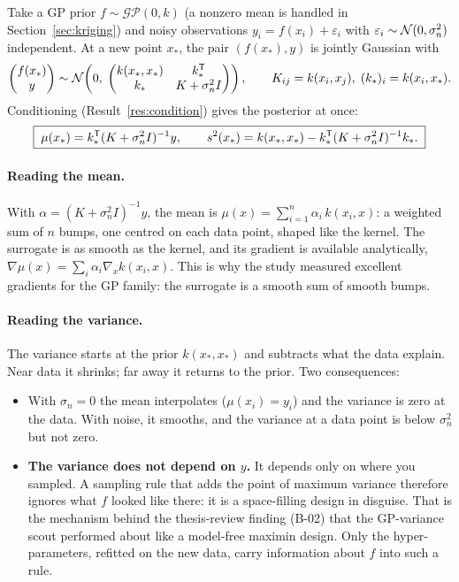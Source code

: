Take a GP prior $f \sim \mathcal{GP}(0, k)$ (a nonzero mean is handled in Section~\ref{sec:kriging}) and noisy
observations $y_i = f(x_i) + \varepsilon_i$ with $\varepsilon_i \sim \mathcal{N}(0,\sigma_n^2)$ independent. At a new point
$x_*$, the pair $(f(x_*), y)$ is jointly Gaussian with
\begin{equation}
  \begin{pmatrix} f(x_*) \\ y \end{pmatrix} \sim
  \mathcal{N}\!\left(0,\; \begin{pmatrix} k(x_*,x_*) & k_*^{\mathsf{T}} \\ k_* & K + \sigma_n^2 I \end{pmatrix}\right),
  \qquad K_{ij} = k(x_i,x_j),\; (k_*)_i = k(x_i, x_*).
\end{equation}
Conditioning (Result~\ref{res:condition}) gives the posterior at once:
\begin{equation}
  \boxed{\;
  \mu(x_*) = k_*^{\mathsf{T}} (K + \sigma_n^2 I)^{-1} y, \qquad
  s^2(x_*) = k(x_*,x_*) - k_*^{\mathsf{T}} (K + \sigma_n^2 I)^{-1} k_* .\;}
  \label{eq:gp_post}
\end{equation}

\paragraph{Reading the mean.} With $\alpha = (K + \sigma_n^2 I)^{-1} y$, the mean is
$\mu(x) = \sum_{i=1}^n \alpha_i\, k(x_i, x)$: a weighted sum of $n$ bumps, one centred on each data point, shaped
like the kernel. The surrogate is as smooth as the kernel, and its gradient is available analytically,
$\nabla\mu(x) = \sum_i \alpha_i \nabla_x k(x_i, x)$. This is why the study measured excellent gradients for the GP
family: the surrogate is a smooth sum of smooth bumps.

\paragraph{Reading the variance.} The variance starts at the prior $k(x_*,x_*)$ and subtracts what the data explain.
Near data it shrinks; far away it returns to the prior. Two consequences:
\begin{itemize}[nosep]
  \item With $\sigma_n = 0$ the mean interpolates ($\mu(x_i) = y_i$) and the variance is zero at the data. With
        noise, it smooths, and the variance at a data point is below $\sigma_n^2$ but not zero.
  \item \textbf{The variance does not depend on $y$.} It depends only on where you sampled. A sampling rule that
        adds the point of maximum variance therefore ignores what $f$ looked like there: it is a space-filling
        design in disguise. That is the mechanism behind the thesis-review finding (B-02) that the GP-variance scout
        performed about like a model-free maximin design. Only the hyper-parameters, refitted on the new data,
        carry information about $f$ into such a rule.
\end{itemize}

